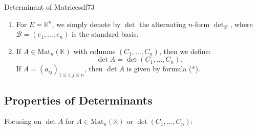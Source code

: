 \documentclass[11pt, a4paper]{article}
\newcommand{\K}{\mathbb{K}}
\begin{document}
\begin{definition}{Determinant of Matrices}{df73}
  \begin{enumerate}
    \item For $E = \K^n$, we simply denote by $\det$ the alternating $n$-form $\det_{\mathcal{B}}$, where $\mathcal{B} = (e_1, \dots, e_n)$ is the standard basis.
    \item If $A \in \text{Mat}_n(\K)$ with columns $(C_1, \dots, C_n)$, then we define:
    \[
      \det A = \det(C_1, \dots, C_n).
    \]
    If $A = (a_{ij})_{1 \le i,j \le n}$, then $\det A$ is given by formula (*).
  \end{enumerate}
\end{definition}

\subsection{Properties of Determinants}

Focusing on $\det A$ for $A \in \text{Mat}_n(\K)$ or $\det(C_1, \dots, C_n)$:
\end{document}
